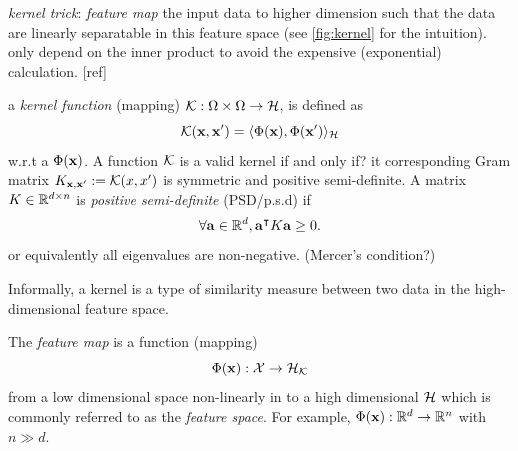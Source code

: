 \emph{kernel trick}: \emph{feature map} the input data to higher dimension such that the data are linearly separatable in this feature space (see \cref{fig:kernel} for the intuition).
only depend on the inner product to avoid the expensive (exponential) calculation. [ref]
\begin{definition}\label{def:kernel}
	a \emph{kernel function} (mapping) $\mathcal{K}: \Omega\times\Omega\to\mathcal{H}$,
	is defined as 
	\begin{equation}
		\mathcal{K}(\vb{x},\vb{x}') = \langle \Phi(\vb{x}),\Phi(\vb{x}') \rangle_{\mathcal{H}}
		\label{eq:kernel_classical}
	\end{equation}
	w.r.t a  $\Phi(\vb{x})$.
	A function $\mathcal{K}$ is a valid kernel if and only if? it corresponding Gram matrix $K_{\vb{x},\vb{x}'}:=\mathcal{K}(x,x')$ is symmetric and positive semi-definite.
	A matrix $K\in\mathbb{R}^{d\times n}$ is \emph{positive semi-definite} (PSD/p.s.d) if
	\begin{equation}
		\forall \vb{a} \in \mathbb{R}^d, \vb{a}^\intercal K \vb{a} \ge 0.
	\end{equation}
	or equivalently all eigenvalues are non-negative. (Mercer's condition?)
\end{definition}
Informally, a kernel is a type of similarity measure between two data in the high-dimensional feature space.
\begin{definition}\label{def:feature_map_classical}
	The \emph{feature map} is a function (mapping)
	\begin{equation}
		\Phi(\vb{x}) : \mathcal{X} \to \mathcal{H}_{\mathcal{K}}
		\label{eq:feature_map_classical}
	\end{equation}
	from a low dimensional space non-linearly in to a high dimensional  $\mathcal{H}$ which is commonly referred to as the \emph{feature space}.
	For example, $\Phi(\vb{x}):\mathbb{R}^d \to \mathbb{R}^n$ with $n\gg d$.
\end{definition}
